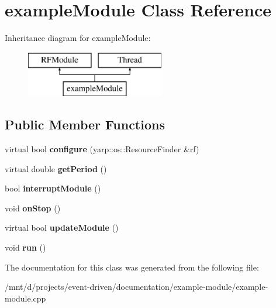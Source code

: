 \hypertarget{classexampleModule}{}\section{example\+Module Class Reference}
\label{classexampleModule}
Inheritance diagram for example\+Module\+:\begin{figure}[H]
\begin{center}
\leavevmode
\includegraphics[height=2.000000cm]{classexampleModule}
\end{center}
\end{figure}
\subsection*{Public Member Functions}
\begin{DoxyCompactItemize}
\item 
\mbox{\label{classexampleModule_ad4d614a75a36e54b416b95ce48e23809}} 
virtual bool {\bfseries configure} (yarp\+::os\+::\+Resource\+Finder \&rf)
\item 
\mbox{\label{classexampleModule_a9316bf049434e746a26242f30226f0ff}} 
virtual double {\bfseries get\+Period} ()
\item 
\mbox{\label{classexampleModule_af7f744b259d435200d1669d138d6c6cd}} 
bool {\bfseries interrupt\+Module} ()
\item 
\mbox{\label{classexampleModule_a5263e596f82ccaf25f39e41c399c23aa}} 
void {\bfseries on\+Stop} ()
\item 
\mbox{\label{classexampleModule_ae2b99b0679b122d2aeb53aa44f106f55}} 
virtual bool {\bfseries update\+Module} ()
\item 
\mbox{\label{classexampleModule_a62c8579890452322481beb0f6aedb1a4}} 
void {\bfseries run} ()
\end{DoxyCompactItemize}


The documentation for this class was generated from the following file\+:\begin{DoxyCompactItemize}
\item 
/mnt/d/projects/event-\/driven/documentation/example-\/module/example-\/module.\+cpp\end{DoxyCompactItemize}

